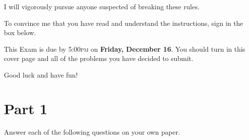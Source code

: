 \documentclass[11pt]{article}
\theoremstyle{definition}
\begin{document}
I will vigorously pursue anyone suspected of breaking these rules. 

\bigskip

To convince me that you have read and understand the instructions, sign in the box below.

\bigskip



\bigskip

This Exam is due by 5:00\textsc{pm} on \textbf{Friday, December 16}.  You should turn in this cover page and all of the problems you have decided to submit.

\bigskip

Good luck and have fun!

\newpage

\section*{Part 1}

Answer each of the following questions on your own paper.
\end{document}
